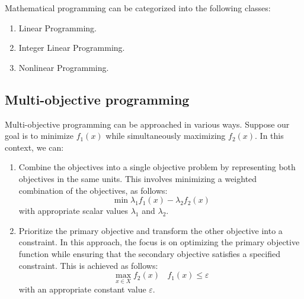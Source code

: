 Mathematical programming can be categorized into the following classes:
\begin{enumerate}
    \item Linear Programming.
    \item Integer Linear Programming.
    \item Nonlinear Programming. 
\end{enumerate}

\subsection*{Multi-objective programming}
Multi-objective programming can be approached in various ways. 
Suppose our goal is to minimize $f_1(x)$ while simultaneously maximizing $f_2(x)$. 
In this context, we can:
\begin{enumerate}
    \item Combine the objectives into a single objective problem by representing both objectives in the same units. 
        This involves minimizing a weighted combination of the objectives, as follows:
        \[\min{\lambda_1f_1(x)-\lambda_2f_2(x)}\]
        with appropriate scalar values $\lambda_1$ and $\lambda_2$.
    \item Prioritize the primary objective and transform the other objective into a constraint. 
        In this approach, the focus is on optimizing the primary objective function while ensuring that the secondary objective satisfies a specified constraint. 
        This is achieved as follows:
        \[\max_{x \in X}f_2(x) \:\:\:\: f_1(x)\leq \varepsilon\]
        with an appropriate constant value $\varepsilon$. 
\end{enumerate}
